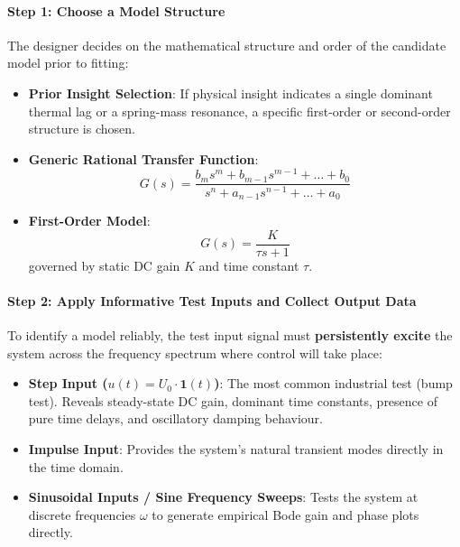 \documentclass[12pt,onecolumn,twoside ]{article}
\begin{document}
	\paragraph{Step 1: Choose a Model Structure}
	The designer decides on the mathematical structure and order of the candidate model prior to fitting:
	\begin{itemize}
		\item
		\textbf{Prior Insight Selection}: If physical insight indicates a single dominant thermal lag or a spring-mass resonance, a specific first-order or second-order structure is chosen.
		\item
		\textbf{Generic Rational Transfer Function}: \[
		G(s) = \frac{b_m s^m + b_{m-1} s^{m-1} + \dots + b_0}{s^n + a_{n-1} s^{n-1} + \dots + a_0}
		\]
		\item
		\textbf{First-Order Model}: \[
		G(s) = \frac{K}{\tau s + 1}
		\] governed by static DC gain $K$ and time constant $\tau$.
	\end{itemize}
	\paragraph{Step 2: Apply Informative Test Inputs and Collect Output Data}
	To identify a model reliably, the test input signal must \textbf{persistently excite} the system across the frequency spectrum where control will take place:
	\begin{itemize}
		\item
		\textbf{Step Input ($u(t) = U_0 \cdot \mathbf{1}(t)$)}: The most common industrial test (bump test). Reveals steady-state DC gain, dominant time constants, presence of pure time delays, and oscillatory damping behaviour.
		\item
		\textbf{Impulse Input}: Provides the system’s natural transient modes directly in the time domain.
		\item
		\textbf{Sinusoidal Inputs / Sine Frequency Sweeps}: Tests the system at discrete frequencies $\omega$ to generate empirical Bode gain and phase plots directly.
	\end{itemize}
\end{document}
